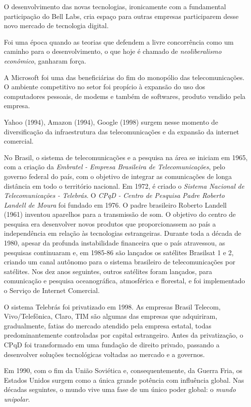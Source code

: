 \documentclass{hipatia}
\begin{document}
O desenvolvimento das novas tecnologias, ironicamente com a fundamental participação do Bell Labs, cria espaço para outras empresas participarem desse novo mercado de tecnologia digital.

Foi uma época quando as teorias que defendem a livre concorrência como um caminho para o desenvolvimento, o que hoje é chamado de \textit{neoliberalismo econômico}, ganharam força.

A Microsoft foi uma das beneficiárias do fim do monopólio das telecomunicações. O ambiente competitivo no setor foi propício à expansão do uso dos computadores pessoais, de modems e também de softwares, produto vendido pela empresa.

Yahoo (1994), Amazon (1994), Google (1998) surgem nesse momento de diversificação da infraestrutura das telecomunicações e da expansão da internet comercial.

No Brasil, o sistema de telecomunicações e a pesquisa na área se iniciam em 1965, com a criação da \textit{Embratel - Empresa Brasileira de Telecomunicações}, pelo governo federal do país, com o objetivo de integrar as comunicações de longa distância em todo o território nacional. Em 1972, é criado o \textit{Sistema Nacional de Telecomunicações - Telebrás}. O \textit{CPqD - Centro de Pesquisa Padre Roberto Landell de Moura} foi fundado em 1976. O padre brasileiro Roberto Landell (1961) inventou aparelhos para a transmissão de som. O objetivo do centro de pesquisa era desenvolver novos produtos que proporcionassem ao país a  independência em relação às tecnologias estrangeiras. Durante toda a década de 1980, apesar da profunda instabilidade financeira que o país atravessou, as pesquisas continuaram e, em 1985-86 são lançados os satélites Brasilsat 1 e 2, criando um canal autônomo para o sistema brasileiro de telecomunicações por satélites. Nos dez anos seguintes, outros satélites foram lançados, para comunicação e pesquisa oceanográfica, atmosférica e florestal, e foi implementado o Serviço de Internet Comercial. 

O sistema Telebrás foi privatizado em 1998. As empresas Brasil Telecom, Vivo/Telefônica, Claro, TIM são algumas das empresas que adquiriram, gradualmente, fatias do mercado atendido pela empresa estatal, todas predominantemente controladas por capital estrangeiro. Antes da privatização, o CPqD foi transformado em uma fundação de direito privado, passando a desenvolver soluções tecnológicas voltadas ao mercado e a governos.

Em 1990, com o fim da União Soviética e, consequentemente, da Guerra Fria, os Estados Unidos surgem como a única grande potência com influência global. Nas décadas seguintes, o mundo vive uma fase de um único poder global: o \textit{mundo unipolar}.
\end{document}
